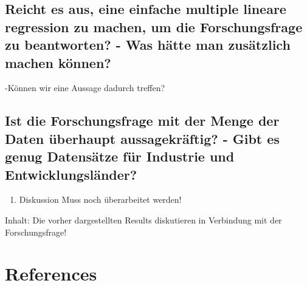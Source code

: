 \documentclass[
  11pt,
  a4paper,
  twoside]{scrbook}
\providecommand{\tightlist}{%
  \setlength{\itemsep}{0pt}\setlength{\parskip}{0pt}}
\begin{document}
\hypertarget{reicht-es-aus-eine-einfache-multiple-lineare-regression-zu-machen-um-die-forschungsfrage-zu-beantworten---was-huxe4tte-man-zusuxe4tzlich-machen-kuxf6nnen}{%
\section{Reicht es aus, eine einfache multiple lineare regression zu machen, um die Forschungsfrage zu beantworten? - Was hätte man zusätzlich machen können?}\label{reicht-es-aus-eine-einfache-multiple-lineare-regression-zu-machen-um-die-forschungsfrage-zu-beantworten---was-huxe4tte-man-zusuxe4tzlich-machen-kuxf6nnen}}

-Können wir eine Aussage dadurch treffen?

\hypertarget{ist-die-forschungsfrage-mit-der-menge-der-daten-uxfcberhaupt-aussagekruxe4ftig---gibt-es-genug-datensuxe4tze-fuxfcr-industrie-und-entwicklungsluxe4nder}{%
\section{Ist die Forschungsfrage mit der Menge der Daten überhaupt aussagekräftig? - Gibt es genug Datensätze für Industrie und Entwicklungsländer?}\label{ist-die-forschungsfrage-mit-der-menge-der-daten-uxfcberhaupt-aussagekruxe4ftig---gibt-es-genug-datensuxe4tze-fuxfcr-industrie-und-entwicklungsluxe4nder}}

\begin{enumerate}
\def\labelenumi{\arabic{enumi}.}
\setcounter{enumi}{4}
\tightlist
\item
  Diskussion
  Muss noch überarbeitet werden!
\end{enumerate}

Inhalt:
Die vorher dargestellten Results diskutieren in Verbindung mit der Forschungsfrage!

\pagebreak

\hypertarget{references}{%
\chapter*{References}\label{references}}
\end{document}
